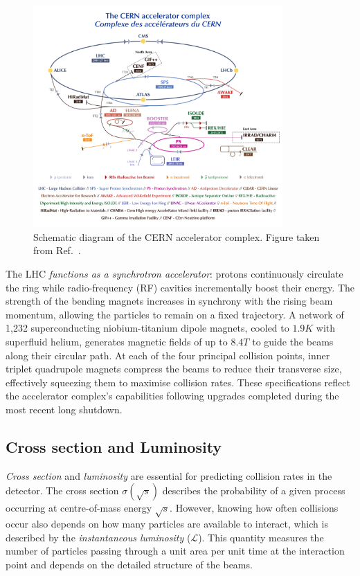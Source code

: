 \begin{figure}[!htbp]
\centering
\includegraphics[width= 0.85\textwidth]{Figures/Chapter3/LHC_AcceleratorComplex.pdf}
\caption[Schematic diagram of the CERN accelerator complex]{Schematic diagram of the \ac{CERN} accelerator complex. Figure taken from Ref.~\cite{LHC_InjectorComplex}.}
\label{Figure:Chapter3_LHC_Complex}
\end{figure}

The \ac{LHC} \textit{functions as a synchrotron accelerator}: protons continuously circulate the ring while radio-frequency (RF) cavities incrementally boost their energy. The strength of the bending magnets increases in synchrony with the rising beam momentum, allowing the particles to remain on a fixed trajectory. A network of 1,232 superconducting niobium-titanium dipole magnets, cooled to $1.9\unit{K}$ with superfluid helium, generates magnetic fields of up to $8.4\unit{T}$ to guide the beams along their circular path. At each of the four principal collision points, inner triplet quadrupole magnets compress the beams to reduce their transverse size, effectively squeezing them to maximise collision rates. These specifications reflect the accelerator complex's capabilities following upgrades completed during the most recent long shutdown.

\subsection{Cross section and Luminosity}

\textit{Cross section} and \textit{luminosity} are essential for predicting collision rates in the detector. The cross section $\sigma(\sqrt{s})$ describes the probability of a given process occurring at centre-of-mass energy $\sqrt{s}$. However, knowing how often collisions occur also depends on how many particles are available to interact, which is described by the \textit{instantaneous luminosity} ($\mathscr{L}$). This quantity measures the number of particles passing through a unit area per unit time at the interaction point and depends on the detailed structure of the beams.

